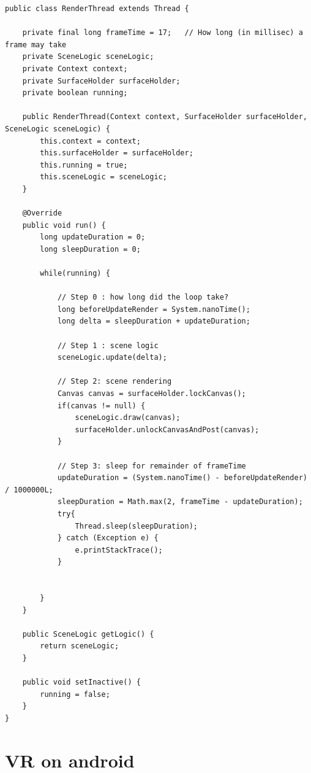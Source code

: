 \begin{lstlisting}
public class RenderThread extends Thread {

    private final long frameTime = 17;   // How long (in millisec) a frame may take
    private SceneLogic sceneLogic;
    private Context context;
    private SurfaceHolder surfaceHolder;
    private boolean running;

    public RenderThread(Context context, SurfaceHolder surfaceHolder, SceneLogic sceneLogic) {
        this.context = context;
        this.surfaceHolder = surfaceHolder;
        this.running = true;
        this.sceneLogic = sceneLogic;
    }

    @Override
    public void run() {
        long updateDuration = 0;
        long sleepDuration = 0;

        while(running) {

            // Step 0 : how long did the loop take?
            long beforeUpdateRender = System.nanoTime();
            long delta = sleepDuration + updateDuration;

            // Step 1 : scene logic
            sceneLogic.update(delta);

            // Step 2: scene rendering
            Canvas canvas = surfaceHolder.lockCanvas();
            if(canvas != null) {
                sceneLogic.draw(canvas);
                surfaceHolder.unlockCanvasAndPost(canvas);
            }

            // Step 3: sleep for remainder of frameTime
            updateDuration = (System.nanoTime() - beforeUpdateRender) / 1000000L;
            sleepDuration = Math.max(2, frameTime - updateDuration);
            try{
                Thread.sleep(sleepDuration);
            } catch (Exception e) {
                e.printStackTrace();
            }


        }
    }

    public SceneLogic getLogic() {
        return sceneLogic;
    }

    public void setInactive() {
        running = false;
    }
}
\end{lstlisting}










\section{VR on android}

